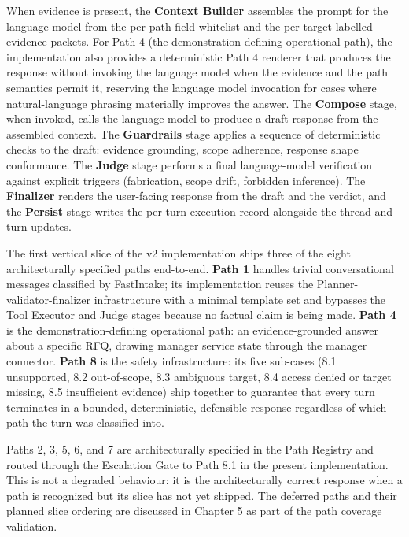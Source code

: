 When evidence is present, the \textbf{Context Builder} assembles the prompt for the language model from the per-path field whitelist and the per-target labelled evidence packets. For Path 4 (the demonstration-defining operational path), the implementation also provides a deterministic Path 4 renderer that produces the response without invoking the language model when the evidence and the path semantics permit it, reserving the language model invocation for cases where natural-language phrasing materially improves the answer. The \textbf{Compose} stage, when invoked, calls the language model to produce a draft response from the assembled context. The \textbf{Guardrails} stage applies a sequence of deterministic checks to the draft: evidence grounding, scope adherence, response shape conformance. The \textbf{Judge} stage performs a final language-model verification against explicit triggers (fabrication, scope drift, forbidden inference). The \textbf{Finalizer} renders the user-facing response from the draft and the verdict, and the \textbf{Persist} stage writes the per-turn execution record alongside the thread and turn updates.

The first vertical slice of the v2 implementation ships three of the eight architecturally specified paths end-to-end. \textbf{Path 1} handles trivial conversational messages classified by FastIntake; its implementation reuses the Planner-validator-finalizer infrastructure with a minimal template set and bypasses the Tool Executor and Judge stages because no factual claim is being made. \textbf{Path 4} is the demonstration-defining operational path: an evidence-grounded answer about a specific RFQ, drawing manager service state through the manager connector. \textbf{Path 8} is the safety infrastructure: its five sub-cases (8.1 unsupported, 8.2 out-of-scope, 8.3 ambiguous target, 8.4 access denied or target missing, 8.5 insufficient evidence) ship together to guarantee that every turn terminates in a bounded, deterministic, defensible response regardless of which path the turn was classified into.

Paths 2, 3, 5, 6, and 7 are architecturally specified in the Path Registry and routed through the Escalation Gate to Path 8.1 in the present implementation. This is not a degraded behaviour: it is the architecturally correct response when a path is recognized but its slice has not yet shipped. The deferred paths and their planned slice ordering are discussed in Chapter 5 as part of the path coverage validation.

